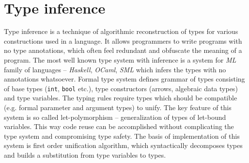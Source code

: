 \documentclass[inz, english, shortabstract]{iithesis}
\begin{document}
\section{Type inference}
Type inference is a technique of algorithmic reconstruction of types for various constructions used in a language.
It allows programmers to write programs with no type annotations, which often feel redundant and obfuscate the meaning of a program.
The most well known type system with inference is a system for \emph{ML} family of languages -- \emph{Haskell}, \emph{OCaml}, \emph{SML} which infers the types with no annotations whatsoever.
Formal type system defines grammar of types consisting of base types (\texttt{int}, \texttt{bool} etc.), type constructors (arrows, algebraic data types) and type variables.
The typing rules require types which should be compatible (e.g. formal parameter and argument types) to unify.
The key feature of this system is so called let-polymorphism -- generalization of types of let-bound variables.
This way code reuse can be accomplished without complicating the type system and compromising type safety.
The basis of implementation of this system is first order unification algorithm, which syntactically decomposes types and builds a substitution from type variables to types.
\end{document}
